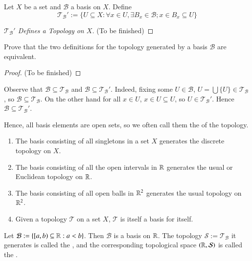 \documentclass[12pt, a4paper, oneside, openright, titlepage]{book}
\begin{document}
\begin{defn}
    Let $X$ be a set and $\mathcal{B}$ a basis on $X$. Define \begin{equation*}
        \mathcal{T}_{\mathcal{B}}' := \{U\subseteq X:\forall x \in U,\exists B_x \in \mathcal{B};x \in B_x \subseteq U\}
    \end{equation*}
\end{defn}
\begin{proof}[$\mathcal{T}_{\mathcal{B}}'$ Defines a Topology on $X$]
    (To be finished)
\end{proof}


\begin{xca}
    Prove that the two definitions for the topology generated by a basis $\mathcal{B}$ are equivalent. 
\end{xca}
\begin{proof}
    (To be finished)
\end{proof}


\begin{rmk}
    Observe that $\mathcal{B} \subseteq \mathcal{T}_{\mathcal{B}}$ and $\mathcal{B} \subseteq \mathcal{T}_{\mathcal{B}}'$. Indeed, fixing some $U \in \mathcal{B}$, $U = \bigcup\{U\} \in \mathcal{T}_{\mathcal{B}}$, so $\mathcal{B} \subseteq \mathcal{T}_{\mathcal{B}}$. On the other hand for all $x \in U$, $x \in U \subseteq U$, so $U \in \mathcal{T}_{\mathcal{B}}'$. Hence $\mathcal{B}\subseteq \mathcal{T}_{\mathcal{B}}'$.

    Hence, all basis elements are open sets, so we often call them the  of the topology.
\end{rmk}

\begin{eg}
    \leavevmode
    \begin{enumerate}
        \item The basis consisting of all singletons in a set $X$ generates the discrete topology on $X$.
        \item The basis consisting of all the open intervals in $\mathbb R$ generates the usual or Euclidean topology on $\mathbb R$.
        \item The basis consisting of all open balls in $\mathbb R^2$ generates the usual topology on $\mathbb R^2$.
        \item Given a topology $\mathcal{T}$ on a set $X$, $\mathcal{T}$ is itself a basis for itself.
    \end{enumerate}
\end{eg}

\begin{defn}
    Let $\mathcal{B} := \{[a,b)\subseteq\mathbb R:a <b\}$. Then $\mathcal{B}$ is a basis on $\mathbb R$. The topology $\mathcal{S} := \mathcal{T}_{\mathcal{B}}$ it generates is called the , and the corresponding topological space $(\mathbb R,\mathcal{S})$ is called the . 
\end{defn}
\end{document}

